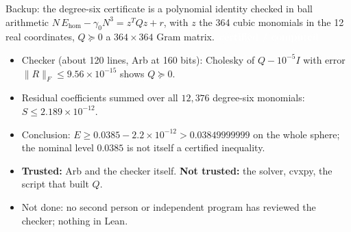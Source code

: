 \documentclass[aspectratio=169,11pt,t]{beamer}
\newcommand{\tg}[2]{{\setlength{\fboxsep}{1.2pt}\colorbox{#1}{\textcolor{white}{\sffamily\bfseries\footnotesize\,#2\,}}}}
\newcommand{\Tcert}{\tg{cCert}{certified / computed}}
\newcommand{\norm}[1]{\lVert #1\rVert}
\begin{document}
\begin{frame}{Backup: the degree-six certificate is a polynomial identity checked in ball arithmetic}
\small
$N\,E_{\mathrm{hom}}-\gamma_0N^3=z^{T}Qz+r$, with $z$ the 364 cubic monomials in the 12 real coordinates, $Q\succeq0$ a $364\times364$ Gram matrix. \Tcert
\begin{itemize}\setlength\itemsep{2pt}\footnotesize
\item Checker (about 120 lines, Arb at 160 bits): Cholesky of $Q-10^{-5}I$ with error $\norm{R}_F\le9.56\times10^{-15}$ shows $Q\succeq0$.
\item Residual coefficients summed over all $12{,}376$ degree-six monomials: $S\le2.189\times10^{-12}$.
\item Conclusion: $E\ge0.0385-2.2\times10^{-12}>0.03849999999$ on the whole sphere; the nominal level $0.0385$ is not itself a certified inequality.
\item \textbf{Trusted:} Arb and the checker itself. \textbf{Not trusted:} the solver, cvxpy, the script that built $Q$.
\item Not done: no second person or independent program has reviewed the checker; nothing in Lean.
\end{itemize}
\end{frame}
\end{document}
